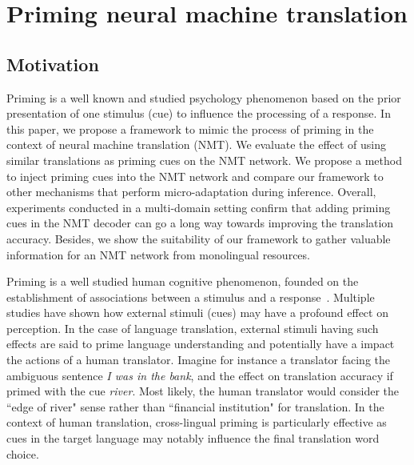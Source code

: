 \chapter{Priming neural machine translation}
\section{Motivation}
Priming is a well known and studied psychology phenomenon based on the prior presentation of one stimulus (cue) to influence the processing of a response. 
In this paper, we propose a framework to mimic the process of priming in the context of neural machine translation (NMT). 
We evaluate the effect of using similar translations as priming cues on the NMT network. 
We propose a method to inject priming cues into the NMT network
and compare our framework to other mechanisms that perform micro-adaptation during inference. 
Overall, experiments conducted in a multi-domain setting confirm that adding priming cues in the NMT decoder can go a long way towards improving the translation accuracy.
Besides, we show the suitability of our framework to gather valuable information for an NMT network from monolingual resources. 

Priming is a well studied human cognitive phenomenon, founded on the establishment of associations between a stimulus and a response~\cite{Tulving82Priming}. Multiple studies have shown how external stimuli (cues) may have a profound effect on perception.
%
In the case of language translation, external stimuli having such effects are said to prime language understanding and potentially have a impact the actions of a human translator. 
Imagine for instance a translator facing the ambiguous sentence {\it I was in the bank}, and the effect on translation accuracy if primed with the cue {\it river}. Most likely, the human translator would consider the ``edge of river" sense rather than ``financial institution" for translation. 
In the context of human translation, cross-lingual priming is particularly effective as cues in the target language may 
notably influence the final translation word choice.

